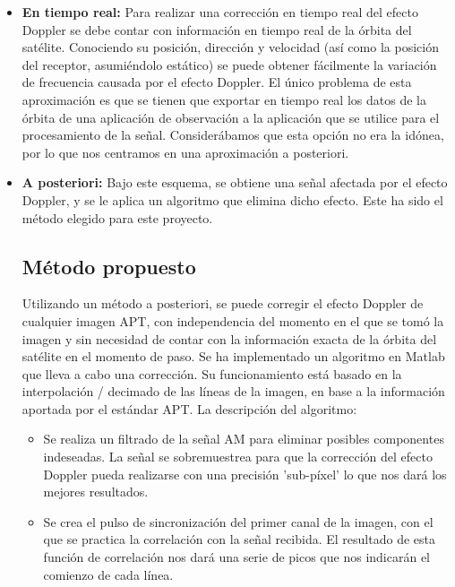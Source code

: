 \documentclass[a4paper,openright,12pt]{article}
\begin{document}
	\begin{itemize}
	
	\item \textbf{En tiempo real:} Para realizar una corrección en tiempo real del efecto Doppler se debe contar con información en tiempo real de la órbita del satélite. Conociendo su posición, dirección y velocidad (así como la posición del receptor, asumiéndolo estático) se puede obtener fácilmente la variación de frecuencia causada por el efecto Doppler. El único problema de esta aproximación es que se tienen que exportar en tiempo real los datos de la órbita de una aplicación de observación a la aplicación que se utilice para el procesamiento de la señal. Considerábamos que esta opción no era la idónea, por lo que nos centramos en una aproximación a posteriori.
	
	\item \textbf{A posteriori:} Bajo este esquema, se obtiene una señal afectada por el efecto Doppler, y se le aplica un algoritmo que elimina dicho efecto. Este ha sido el método elegido para este proyecto.
	
	\subsection{Método propuesto} 
	
	Utilizando un método a posteriori, se puede corregir el efecto Doppler de cualquier imagen APT, con independencia del momento en el que se tomó la imagen y sin necesidad de contar con la información exacta de la órbita del satélite en el momento de paso. Se ha implementado un algoritmo en Matlab que lleva a cabo una corrección. Su funcionamiento está basado en la interpolación / decimado de las líneas de la imagen, en base a la información aportada por el estándar APT. La descripción del algoritmo:

\begin{itemize}

	\item Se realiza un filtrado de la señal AM para eliminar posibles componentes indeseadas. La señal se sobremuestrea para que la corrección del efecto Doppler pueda realizarse con una precisión 'sub-píxel' lo que nos dará los mejores resultados.
	
	\item Se crea el pulso de sincronización del primer canal de la imagen, con el que se practica la correlación con la señal recibida. El resultado de esta función de correlación nos dará una serie de picos que nos indicarán el comienzo de cada línea.
	

\end{itemize}
\end{itemize}
\end{document}
